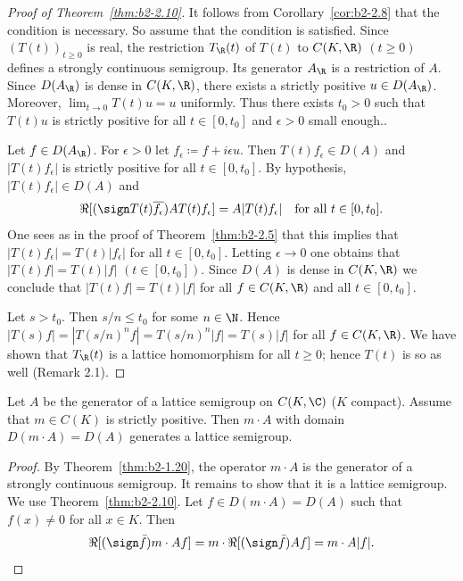 \begin{proof}[Proof of Theorem~\ref{thm:b2-2.10}]
It follows from  Corollary~\ref{cor:b2-2.8} that the condition is necessary.
So assume that the condition is satisfied.
Since $(T(t))_{t \geq 0}$ is real, the restriction $T_{\R}(t)$ of\/ $T(t)$ to $C(K,\R)$ $(t \geq 0)$ defines a strongly continuous semigroup.
Its generator $A_{\R}$ is a restriction of\/ $A$.
Since $D(A_{\R})$ is dense in $C(K,\R)$, there exists a strictly positive $u \in D(A_{\R})$.
Moreover, $\lim_{t \to 0} T(t)u = u$ uniformly.
Thus there exists $t_{0} > 0$ such that $T(t)u$ is strictly positive for all $t \in [0,t_{0}]$ and $ \epsilon > 0 $ small enough..
 
Let $f \in D(A_{\R})$.
For $\epsilon > 0$ let $f_{\epsilon} \coloneqq f + i\epsilon u$.
Then $T(t)f_{\epsilon} \in D(A)$ and $|T(t)f_{\epsilon}|$ is strictly positive for all $t \in [0,t_{0}]$.
By hypothesis, $|T(t)f_{\epsilon}| \in D(A)$ and 
\[
\Re[(\sign T(t)\overline{f_{\epsilon}})AT(t)f_{\epsilon}] = A|T(t)f_{\epsilon}|
\quad \text{for all $t \in [0,t_{0}]$}.
\]
One sees as in the proof of Theorem~\ref{thm:b2-2.5} that this implies that $|T(t)f_{\epsilon}| = T(t)|f_{\epsilon}|$ for all $t \in [0,t_{0}]$.
Letting $\epsilon \to 0$ one obtains that $|T(t)f| = T(t)|f|$ $(t \in [0,t_{0}])$.
Since $D(A)$ is dense in $C(K,\R)$ we conclude that $|T(t)f| = T(t)|f|$ for all $f \in C(K,\R)$ and all $t \in [0,t_{0}]$.

Let $s > t_{0}$.
Then $s/n \leq t_{0}$ for some $n \in \N$.
Hence $|T(s)f| = |T(s/n)^{n}f| = T(s/n)^{n}|f| = T(s)|f|$ for all $f \in C(K,\R)$.
We have shown that $T_{\R}(t)$ is a lattice homomorphism for all $t \geq 0$; hence $T(t)$ is so as well (\cf Remark 2.1).
\end{proof}

\begin{corollary}\label{cor:b2-2.11}
Let $A$ be the generator of a lattice semigroup on $C(K,\C)$ ($K$ compact).
Assume that  $m \in C(K)$ is strictly positive.
Then  $m \cdot A$ with domain $D(m \cdot A) = D(A)$ generates a lattice semigroup.
\end{corollary}

\begin{proof}
By Theorem~\ref{thm:b2-1.20}, the operator  $m \cdot A$ is the generator of a strongly continuous semigroup.
It remains to show that it is a lattice semigroup.
We use Theorem~\ref{thm:b2-2.10}.
Let $f \in D(m \cdot A) = D(A)$ such that $f(x) \neq 0$ for all $x \in K$.
Then 
\[
\Re[(\sign \bar{f})m \cdot Af] = m \cdot \Re[(\sign \bar{f})Af] = m \cdot A|f|.
\]
\end{proof}

